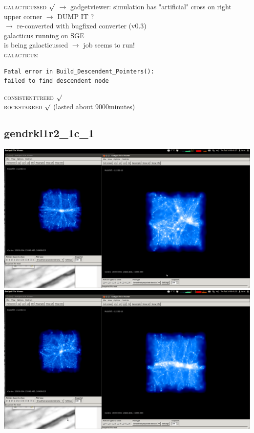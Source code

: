 \textsc{galacticussed} $\surd$
$\rightarrow$ gadgetviewer: simulation has "artificial" cross on right upper corner $\rightarrow$ DUMP IT ? \\
$\rightarrow$ re-converted with bugfixed converter (v0.3) \\
galacticus running on SGE \\
is being galacticussed $\rightarrow$ job seems to run! \\
 \textsc{galacticus}:
 \begin{verbatim}
Fatal error in Build_Descendent_Pointers():
failed to find descendent node 
\end{verbatim}
\textsc{consistenttreed} $\surd$ \\ 
\textsc{rockstarred} $\surd$ (lasted about 9000minutes) \\

% 
%
%
%
%
%
%
%



\newpage
\subsection{gendrkl1r2\_1c\_1}

\includegraphics[scale=0.2]{r256/gendrkl1r2_1c_1/1.png} \\
\includegraphics[scale=0.2]{r256/gendrkl1r2_1c_1/2.png} 

